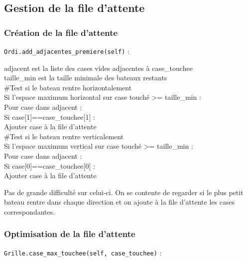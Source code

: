 \newpage

\subsection{Gestion de la file d'attente}
\subsubsection{Création de la file d'attente}\label{add_adjacentes_premiere}
\texttt{Ordi.add\_adjacentes\_premiere(self)} :
\begin{algo1}
adjacent est la liste des cases vides adjacentes à case\_touchee\\
taille\_min est la taille minimale des bateaux restants\\
\#Test si le bateau rentre horizontalement\\
Si l'espace maximum horizontal sur case touché >= taille\_min :\\
Pour case dans adjacent :\\
Si case[1]==case\_touchee[1] :\\
Ajouter case à la file d'attente\\
\#Test si le bateau rentre verticalement\\
Si l'espace maximum vertical sur case touché >= taille\_min :\\
Pour case dans adjacent :\\
Si case[0]==case\_touchee[0] :\\
Ajouter case à la file d'attente\\
\end{algo1}

Pas de grande difficulté sur celui-ci. On se contente de regarder si le plus petit bateau rentre dans chaque direction et on ajoute à la file d'attente les cases correspondantes.
\newpage
\subsubsection{Optimisation de la file d'attente}\label{case_max_touchee}
\texttt{Grille.case\_max\_touchee(self, case\_touchee)} :

